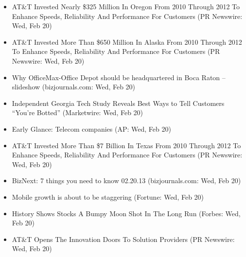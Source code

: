 \documentclass[11pt,asymmetric]{article}
\begin{document}
\begin{itemize}
\item AT\&T Invested Nearly \$325 Million In Oregon From 2010 Through 2012 To Enhance Speeds, Reliability And Performance For Customers (PR Newswire: Wed, Feb 20)
\item AT\&T Invested More Than \$650 Million In Alaska From 2010 Through 2012 To Enhance Speeds, Reliability And Performance For Customers (PR Newswire: Wed, Feb 20)
\item Why OfficeMax-Office Depot should be headquartered in Boca Raton – slideshow (bizjournals.com: Wed, Feb 20)
\item Independent Georgia Tech Study Reveals Best Ways to Tell Customers ``You're Botted'' (Marketwire: Wed, Feb 20)
\item Early Glance: Telecom companies (AP: Wed, Feb 20)
\item AT\&T Invested More Than \$7 Billion In Texas From 2010 Through 2012 To Enhance Speeds, Reliability And Performance For Customers (PR Newswire: Wed, Feb 20)
\item BizNext: 7 things you need to know 02.20.13 (bizjournals.com: Wed, Feb 20)
\item Mobile growth is about to be staggering (Fortune: Wed, Feb 20)
\item History Shows Stocks A Bumpy Moon Shot In The Long Run (Forbes: Wed, Feb 20)
\item AT\&T Opens The Innovation Doors To Solution Providers (PR Newswire: Wed, Feb 20)
\end{itemize}
\end{document}
